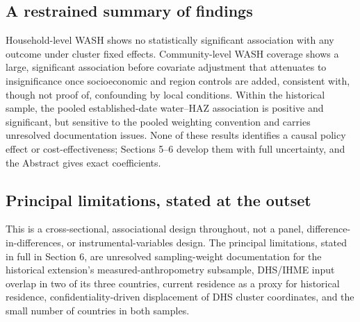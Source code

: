 \subsection{A restrained summary of findings}\label{sec:1.5}

Household-level WASH shows no statistically significant association with any outcome under cluster fixed effects. Community-level WASH coverage shows a large, significant association before covariate adjustment that attenuates to insignificance once socioeconomic and region controls are added, consistent with, though not proof of, confounding by local conditions. Within the historical sample, the pooled established-date water--HAZ association is positive and significant, but sensitive to the pooled weighting convention and carries unresolved documentation issues. None of these results identifies a causal policy effect or cost-effectiveness; Sections 5--6 develop them with full uncertainty, and the Abstract gives exact coefficients.

\subsection{Principal limitations, stated at the outset}\label{sec:1.6}

This is a cross-sectional, associational design throughout, not a panel, difference-in-differences, or instrumental-variables design. The principal limitations, stated in full in Section 6, are unresolved sampling-weight documentation for the historical extension's measured-anthropometry subsample, DHS/IHME input overlap in two of its three countries, current residence as a proxy for historical residence, confidentiality-driven displacement of DHS cluster coordinates, and the small number of countries in both samples.
